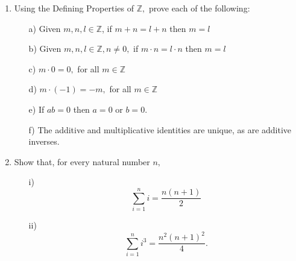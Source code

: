 \documentclass[11pt]{article}
\newcommand{\bbN}{\mathbb{N}}
\newcommand{\bbZ}{\mathbb{Z}}
\renewcommand{\emptyset}{\O}
\begin{document}
\begin{enumerate}
\begin{enumerate}
\begin{proof}

Define a set $S \subset \bbN$ such that $1 \in S$ and if all $ 1 \leq r \leq x \in S$ then $x+1 \in S$. 

If the Principle of Mathematical Induction (PMI) is true, then $S = \bbN$. In other words, if PMI is true then $S \setminus \bbN = \emptyset$. We prove PMI by contradiction.

Assume that $S \setminus \bbN \not= \emptyset$, and call this non-empty set $M$. Then, let the least element of $M$ be $m$. By definition, $1 \in S$, therefore $1 \notin M$, hence $m \not = 1$.

Since $m$ is the least element of $M$, and by definition $S \cup M = \bbN$, we know that all $1 \leq r \leq m-1 \in S$. Then, by the definition of set $S$, $m-1+1 = m$ must be in $S$.

We have reached a contradiction, and this completes the proof.

\renewcommand\qedsymbol{QED}

\end{proof}

\end{enumerate} 
 
 
 \item Using the Defining Properties of ${\mathbb Z},$ prove each of the following:
  \begin{enumerate}
  \item[a)] Given $m,n,l\in\bbZ$, if $m+n=l+n$ then $m=l$ 
  \item[b)] Given $m,n,l\in\bbZ, n\neq 0,$ if $m\cdot n=l\cdot n$ then $ m=l$
   \item[c)] $m\cdot 0=0,$ for all $m\in\bbZ$ 
  \item[d)] $m\cdot (-1)=-m,$ for all $m\in \bbZ$
  \item[e)] If $ab=0$ then  $a=0 $ or $b=0.$ 
\item[f)] The additive and multiplicative identities are unique, as are additive inverses. 
 \end{enumerate} 


 
 \item Show that, for every natural number $n,$
 \begin{enumerate}
 \item[i)] $$\sum_{i=1}^n i =\frac{n(n+1)}{2}$$
 \item[ii)] $$\sum_{i=1}^n i^3 = \frac{n^2 (n+1)^2}{4}.$$
 \end{enumerate}
 

\end{enumerate}
\end{document}

